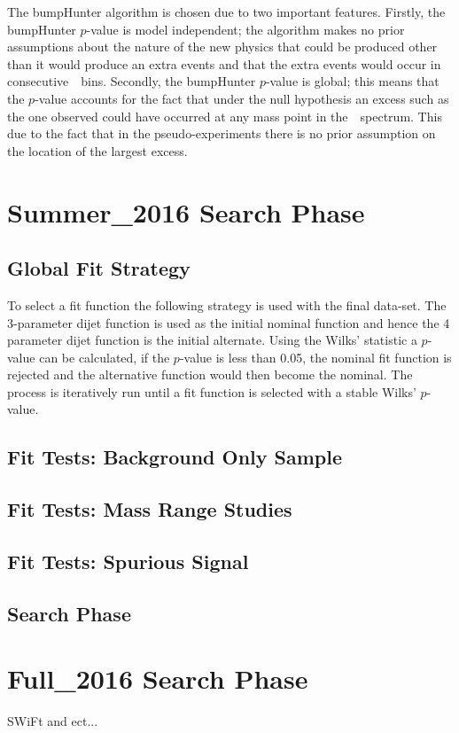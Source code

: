 The bumpHunter algorithm is chosen due to two important features.
Firstly, the bumpHunter $p$-value is model independent;
the algorithm makes no prior assumptions about the nature of the new physics that could be produced
other than it would produce an extra events and that the extra events would occur in consecutive~\mjj~bins.
Secondly, the bumpHunter $p$-value is global;
this means that the $p$-value accounts for the fact that under the null hypothesis an excess such as the one observed could have occurred at any mass point in the~\mjj~spectrum.
This due to the fact that in the pseudo-experiments there is no prior assumption on the location of the largest excess.

\section{Summer\_2016 Search Phase}
\label{sec:bkg-summer}

\subsection{Global Fit Strategy}
\label{sec:bkg-summer_global}

To select a fit function the following strategy is used with the final data-set.
The 3-parameter dijet function is used as the initial nominal function and hence the 4 parameter dijet function is the initial alternate.
Using the Wilks' statistic a $p$-value can be calculated,
if the $p$-value is less than 0.05, the nominal fit function is rejected and the alternative function would then become the nominal.
The process is iteratively run until a fit function is selected with a stable Wilks' $p$-value.

\subsection{Fit Tests: Background Only Sample}
\label{sec:bkg-summer_fitCR}

\subsection{Fit Tests: Mass Range Studies}
\label{sec:bkg-summer_range}

\subsection{Fit Tests: Spurious Signal}
\label{sec:bkg-summer_spusig}

\subsection{Search Phase}
\label{sec:bkg-summer_results}

\section{Full\_2016 Search Phase}
\label{sec:bkg-full}

SWiFt and ect...
